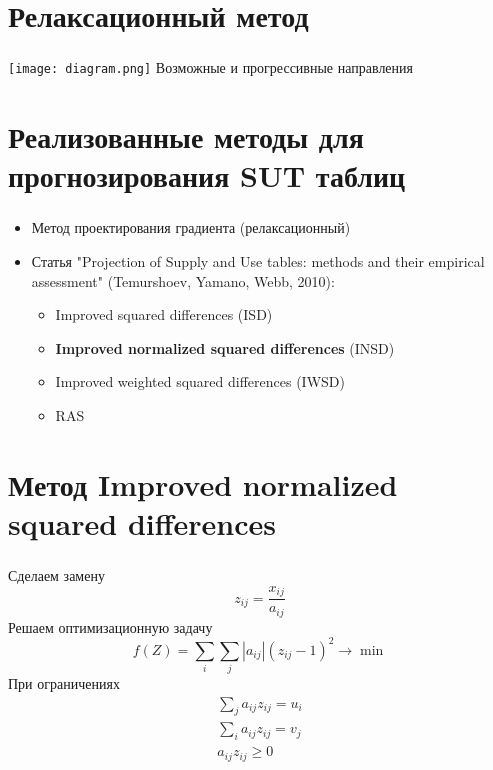 \documentclass{beamer}
\begin{document}
\section{Релаксационный метод}
\begin{frame}
	\frametitle{\insertsection}
	
	\begin{center}
	    \texttt{[image: diagram.png]}
	    Возможные и прогрессивные направления
	\end{center}

\end{frame}

\section{Реализованные методы для прогнозирования SUT таблиц}
\begin{frame}
	\frametitle{\insertsection}
	
	\begin{itemize}
	\item Метод проектирования градиента (релаксационный)
	\item Статья "Projection of Supply and Use tables: methods and their empirical assessment" (Temurshoev, Yamano, Webb, 2010):
	\begin{itemize}
    	\item Improved squared differences (ISD)
    	\item \textbf{Improved normalized squared differences} (INSD)
    	\item Improved weighted squared differences (IWSD)
    	\item RAS
	\end{itemize}
	\end{itemize}
	
\end{frame}

\section{Метод Improved normalized squared differences}
\begin{frame}
	\frametitle{\insertsection}
	Сделаем замену
	$$z_{ij} = \frac{x_{ij}}{a_{ij}}$$
	Решаем оптимизационную задачу
	$$f(Z) = \sum_i \sum_j |a_{ij}|(z_{ij}-1)^2 \to \min$$
	При ограничениях
	$$\begin{matrix}
	\sum_j a_{ij}z_{ij} = u_{i} \\
	\sum_i a_{ij}z_{ij} = v_{j} \\
	a_{ij}z_{ij} \geq 0 \\
	\end{matrix}$$
	
\end{frame}
\end{document}
